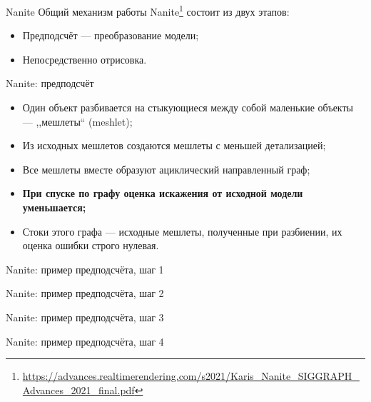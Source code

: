 \documentclass{beamer}
\begin{document}
    \begin{frame}{Nanite}
        Общий механизм работы
        Nanite\footnote{
            \url{https://advances.realtimerendering.com/s2021/Karis_Nanite_SIGGRAPH_Advances_2021_final.pdf}
        } состоит из двух этапов:
        \begin{itemize}
            \item Предподсчёт --- преобразование модели;
            \item Непосредственно отрисовка.
        \end{itemize}
    \end{frame}

    \begin{frame}{Nanite: предподсчёт}
        \begin{itemize}
            \item Один объект разбивается на
            стыкующиеся между собой маленькие объекты
            --- ,,мешлеты`` (meshlet);
            \item Из исходных мешлетов создаются
            мешлеты с меньшей детализацией;
            \item Все мешлеты вместе образуют ациклический
            направленный граф;
            \item \textbf{При спуске по графу
            оценка искажения от исходной модели уменьшается;}
            \item Стоки этого графа --- исходные мешлеты,
            полученные при разбиении,
            их оценка ошибки строго нулевая.
        \end{itemize}
    \end{frame}

    \begin{frame}{Nanite: пример предподсчёта, шаг 1}
        \centering
        
    \end{frame}

    \begin{frame}{Nanite: пример предподсчёта, шаг 2}
        \centering
        
    \end{frame}

    \begin{frame}{Nanite: пример предподсчёта, шаг 3}
        \centering
        
    \end{frame}

    \begin{frame}{Nanite: пример предподсчёта, шаг 4}
        \centering
        
    \end{frame}
\end{document}
